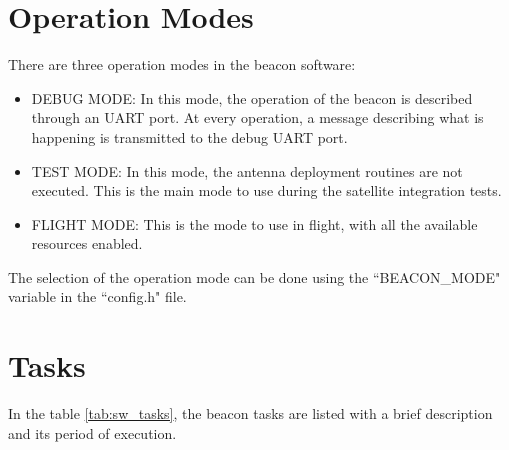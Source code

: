 \documentclass[12pt]{book}
\begin{document}
\section{Operation Modes}

There are three operation modes in the beacon software:

\begin{itemize}
    \item DEBUG MODE: In this mode, the operation of the beacon is described through an UART port. At every operation, a message describing what is happening is transmitted to the debug UART port.
    \item TEST MODE: In this mode, the antenna deployment routines are not executed. This is the main mode to use during the satellite integration tests.
    \item FLIGHT MODE: This is the mode to use in flight, with all the available resources enabled.
\end{itemize}

The selection of the operation mode can be done using the ``BEACON\_MODE" variable in the ``config.h" file.

\section{Tasks}

In the table \ref{tab:sw_tasks}, the beacon tasks are listed with a brief description and its period of execution.
\end{document}
